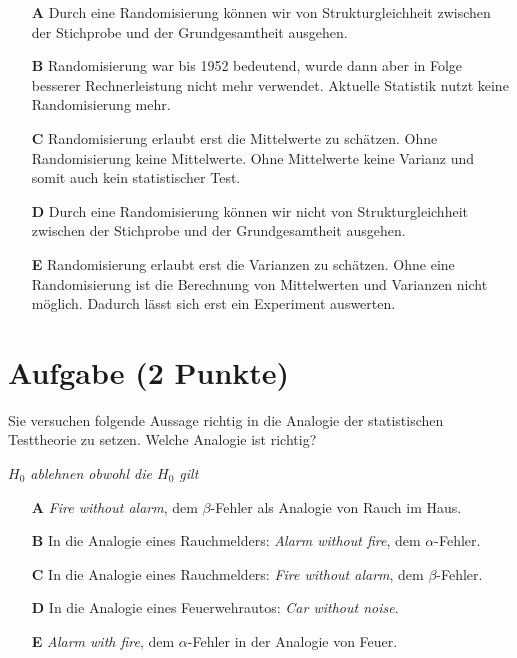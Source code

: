 \documentclass[a4paper, 9pt]{scrartcl}\usepackage[]{graphicx}\usepackage[]{xcolor}
\begin{document}
\begin{enumerate}
\item [\textbf{A} \msquare] Durch eine Randomisierung können wir von Strukturgleichheit zwischen der Stichprobe und der Grundgesamtheit ausgehen.
\item [\textbf{B} \msquare] Randomisierung war bis 1952 bedeutend, wurde dann aber in Folge besserer Rechnerleistung nicht mehr verwendet. Aktuelle Statistik nutzt keine Randomisierung mehr.
\item [\textbf{C} \msquare] Randomisierung erlaubt erst die Mittelwerte zu schätzen. Ohne Randomisierung keine Mittelwerte. Ohne Mittelwerte keine Varianz und somit auch kein statistischer Test.
\item [\textbf{D} \msquare] Durch eine Randomisierung können wir nicht von Strukturgleichheit zwischen der Stichprobe und der Grundgesamtheit ausgehen.
\item [\textbf{E} \msquare] Randomisierung erlaubt erst die Varianzen zu schätzen. Ohne eine Randomisierung ist die Berechnung von Mittelwerten und Varianzen nicht möglich. Dadurch lässt sich erst ein Experiment auswerten.
\end{enumerate}

\section{Aufgabe \hfill (2 Punkte)}



Sie versuchen folgende Aussage richtig in die Analogie der statistischen Testtheorie zu setzen. Welche Analogie ist richtig?

\begin{center}
\textit{$H_0$ ablehnen obwohl die $H_0$ gilt}
\end{center}



\begin{enumerate}
\item [\textbf{A} \msquare] \textit{Fire without alarm}, dem $\beta$-Fehler als Analogie von Rauch im Haus.
\item [\textbf{B} \msquare] In die Analogie eines Rauchmelders: \textit{Alarm without fire}, dem $\alpha$-Fehler.
\item [\textbf{C} \msquare] In die Analogie eines Rauchmelders: \textit{Fire without alarm}, dem $\beta$-Fehler.
\item [\textbf{D} \msquare] In die Analogie eines Feuerwehrautos: \textit{Car without noise}.
\item [\textbf{E} \msquare] \textit{Alarm with fire}, dem $\alpha$-Fehler in der Analogie von Feuer.
\end{enumerate} 
\end{document}
